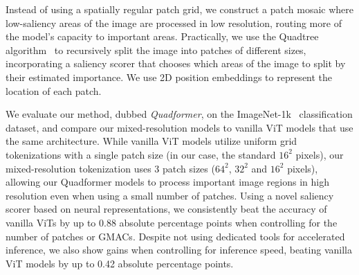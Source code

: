 Instead of using a spatially regular patch grid, we construct a patch mosaic where low-saliency areas of the image are processed in low resolution, routing more of the model’s capacity to important areas. Practically, we use the Quadtree algorithm~\cite{Markas1992QuadTS} to recursively split the image into patches of different sizes, incorporating a saliency scorer that chooses which areas of the image to split by their estimated importance. We use 2D position embeddings to represent the location of each patch.

We evaluate our method, dubbed \textit{Quadformer}, on the ImageNet-1k~\cite{Russakovsky2014ImageNetLS} classification dataset, and compare our mixed-resolution models to vanilla ViT models that use the same architecture. While vanilla ViT models utilize uniform grid tokenizations with a single patch size (in our case, the standard $16^2$ pixels), our mixed-resolution tokenization uses 3 patch sizes ($64^2$, $32^2$ and $16^2$ pixels), allowing our Quadformer models to process important image regions in high resolution even when using a small number of patches. Using a novel saliency scorer based on neural representations, we consistently beat the accuracy of vanilla ViTs by up to 0.88 absolute percentage points when controlling for the number of patches or GMACs. Despite not using dedicated tools for accelerated inference, we also show gains when controlling for inference speed, beating vanilla ViT models by up to 0.42 absolute percentage points.
